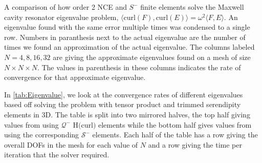 \documentclass[format=acmsmall,screen,timestamp=false,a4paper]{acmart}
\newcommand{\calQ}{\mathcal{Q}}
\newcommand{\calS}{\mathcal{S}}
\begin{document}
\begin{table}[htbp]
\caption{A comparison of how order 2 NCE and $S^-$ finite elements solve the Maxwell cavity resonator eigenvalue problem, $\langle \text{curl}(F), \text{curl}(E) \rangle = \omega^2 \langle F, E \rangle$. An eigenvalue found with the same error multiple times was condensed to a single row.  Numbers in paranthesis next to the actual eigenvalue are the number of times we found an approximation of the actual eigenvalue.  The columns labeled $N=4, 8, 16, 32$ are giving the approximate eigenvalues found on a mesh of size $N \times N \times N$.  The values in parenthesis in these columns indicates the rate of convergence for that approximate eigenvalue.
\label{tab:Eigenvalue} }
\end{table}

In \cref{tab:Eigenvalue}, we look at the convergence rates of different eigenvalues based off solving the problem with tensor product and trimmed serendipity elements in 3D.  The table is split into two mirrored halves, the top half giving values from using $\mathcal{Q}^-$ H$($curl$)$ elements while the bottom half gives values from using the corresponding $\mathcal{S}^-$ elements.  Each half of the table has a row giving the overall DOFs in the mesh for each value of $N$ and a row giving the time per iteration that the solver required.  %
\end{document}
